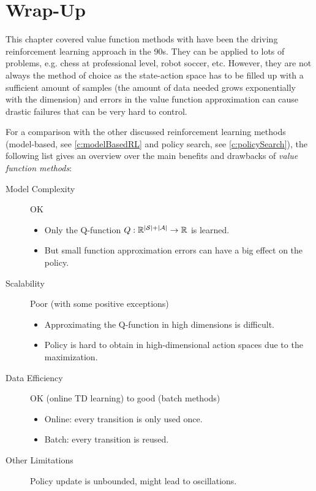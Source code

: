 	\section{Wrap-Up}
		This chapter covered value function methods with have been the driving reinforcement learning approach in the 90s. They can be applied to lots of problems, e.g. chess at professional level, robot soccer, etc. However, they are not always the method of choice as the state-action space has to be filled up with a sufficient amount of samples (the amount of data needed grows exponentially with the dimension) and errors in the value function approximation can cause drastic failures that can be very hard to control.

		For a comparison with the other discussed reinforcement learning methods (model-based, see \autoref{c:modelBasedRL} and policy search, see \autoref{c:policySearch}), the following list gives an overview over the main benefits and drawbacks of \emph{value function methods}:
		\begin{description}
			\item[Model Complexity] OK
				\begin{itemize}
					\item Only the Q-function \( Q : \mathbb{R}^{\lvert \mathcal{S} \rvert + \lvert \mathcal{A} \rvert} \to \mathbb{R} \) is learned.
					\item But small function approximation errors can have a big effect on the policy.
				\end{itemize}
			\item[Scalability] Poor (with some positive exceptions)
				\begin{itemize}
					\item Approximating the Q-function in high dimensions is difficult.
					\item Policy is hard to obtain in high-dimensional action spaces due to the maximization.
				\end{itemize}
			\item[Data Efficiency] OK (online TD learning) to good (batch methods)
				\begin{itemize}
					\item Online: every transition is only used once.
					\item Batch: every transition is reused.
				\end{itemize}
			\item[Other Limitations] Policy update is unbounded, might lead to oscillations.
		\end{description}

